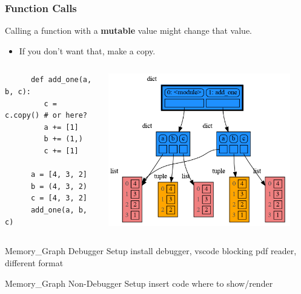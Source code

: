 \documentclass[10pt, colorlinks=true, urlcolor=blue]{beamer}
\begin{document}
\begin{frame}[fragile]
\frametitle{Function Calls}
  Calling a function with a \textbf{mutable} value might change that value.
  \begin{itemize}
  \item If you don't want that, make a copy.
  \end{itemize}

  \begin{columns}
    \begin{verbatim}
      def add_one(a, b, c):
         c = c.copy() # or here?
         a += [1]
         b += (1,)
         c += [1]
         
      a = [4, 3, 2]
      b = (4, 3, 2)
      c = [4, 3, 2]
      add_one(a, b, c)
    \end{verbatim}
    \begin{center}\includegraphics[width=0.9\textwidth]{figures/function_call.png}\end{center}
  \end{columns}
\end{frame}


\begin{frame}{Memory\_Graph Debugger Setup}
  install
  debugger, vscode
  blocking pdf reader, different format
\end{frame}

\begin{frame}{Memory\_Graph Non-Debugger Setup}
  insert code where to show/render
\end{frame}
\end{document}
